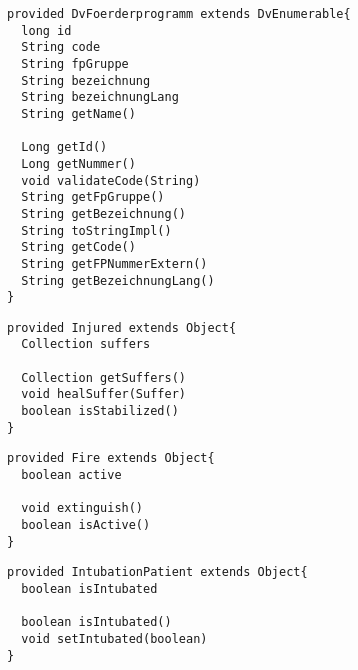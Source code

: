 \begin{lstlisting}[style = dsl, caption = Deklaration von DvFoerderprogramm, captionpos = b, label = lst_DvFoerderprogramm]
provided DvFoerderprogramm extends DvEnumerable{
  long id
  String code
  String fpGruppe
  String bezeichnung
  String bezeichnungLang
  String getName()
  
  Long getId()
  Long getNummer()
  void validateCode(String)
  String getFpGruppe()
  String getBezeichnung()
  String toStringImpl()
  String getCode()
  String getFPNummerExtern()
  String getBezeichnungLang()
}
\end{lstlisting}
\begin{lstlisting}[style = dsl, caption = Deklaration von Injured, captionpos = b, label = lst_Injured]
provided Injured extends Object{
  Collection suffers

  Collection getSuffers()
  void healSuffer(Suffer)
  boolean isStabilized()
}
\end{lstlisting}
\begin{lstlisting}[style = dsl, caption = Deklaration von Fire, captionpos = b, label = lst_Fire]
provided Fire extends Object{
  boolean active

  void extinguish()
  boolean isActive()
}
\end{lstlisting}
\begin{lstlisting}[style = dsl, caption = Deklaration von IntubationPatient, captionpos = b, label = lst_IntubationPatient]
provided IntubationPatient extends Object{
  boolean isIntubated

  boolean isIntubated()
  void setIntubated(boolean)
}
\end{lstlisting}
